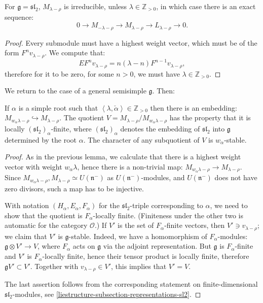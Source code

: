 \begin{lemma}
For $\mathfrak g = \mathfrak{sl}_2$, $M_{\lambda-\rho}$ is irreducible, unless $\lambda \in \mathbb Z_{>0}$, in which case there is an exact sequence:
$$ 0 \to M_{-\lambda-\rho}\to M_{\lambda-\rho} \to L_{\lambda-\rho} \to 0.$$
\end{lemma}

\begin{proof}
 Every submodule must have a highest weight vector, which must be of the form $F^nv_{\lambda-\rho}$. We compute that:
$$ EF^n v_{\lambda-\rho} = n (\lambda-n) F^{n-1} v_{\lambda-\rho},$$
therefore for it to be zero, for some $n>0$, we must have $\lambda\in \mathbb Z_{>0}$.
\end{proof}

We return to the case of a general semisimple $\mathfrak g$. Then:

\begin{proposition}
\label{proposition-sa-quotient}
 If $\alpha$ is a simple root such that $\left< \lambda,\check\alpha\right>\in \mathbb Z_{>0}$ then there is an embedding: $M_{w_\alpha\lambda-\rho}\hookrightarrow M_{\lambda-\rho}$. The quotient $V=M_{\lambda-\rho}/M_{w_\alpha\lambda-\rho}$ has the property that it is locally $(\mathfrak{sl}_2)_\alpha$-finite, where $(\mathfrak{sl}_2)_\alpha$ denotes the embedding of $\mathfrak{sl}_2$ into $\mathfrak g$ determined by the root $\alpha$. The character of any subquotient of $V$ is $w_\alpha$-stable.
\end{proposition}

\begin{proof}
 As in the previous lemma, we calculate that there is a highest weight vector with weight $w_\alpha\lambda$, hence there is a non-trivial map: $M_{w_\alpha\lambda-\rho}\to M_{\lambda-\rho}$. Since $M_{w_\alpha\lambda-\rho}, M_{\lambda-\rho} \simeq U(\mathfrak n^-)$ as $U(\mathfrak n^-)$-modules, and $U(\mathfrak n^-)$ does not have zero divisors, such a map has to be injective.

 With notation $(H_\alpha,E_\alpha,F_\alpha)$ for the $\mathfrak{sl}_2$-triple corresponding to $\alpha$, we need to show that the quotient is $F_\alpha$-locally finite. (Finiteness under the other two is automatic for the category $\mathcal O$.) If $V'$ is the set of $F_\alpha$-finite vectors, then $V'\ni v_{\lambda-\rho}$; we claim that $V'$ is $\mathfrak g$-stable. Indeed, we have a homomorphism of $F_\alpha$-modules: $\mathfrak g\otimes V'\to V$, where $F_\alpha$ acts on $\mathfrak g$ via the adjoint representation. But $\mathfrak g$ is $F_\alpha$-finite and $V'$ is $F_\alpha$-locally finite, hence their tensor product is locally finite, therefore $\mathfrak gV'\subset V'$. Together with $v_{\lambda-\rho}\in V'$, this implies that $V'=V$.
 
 The last assertion follows from the corresponding statement on finite-dimensional $\mathfrak{sl}_2$-modules, see \ref{liestructure-subsection-representations-sl2}.
\end{proof}

